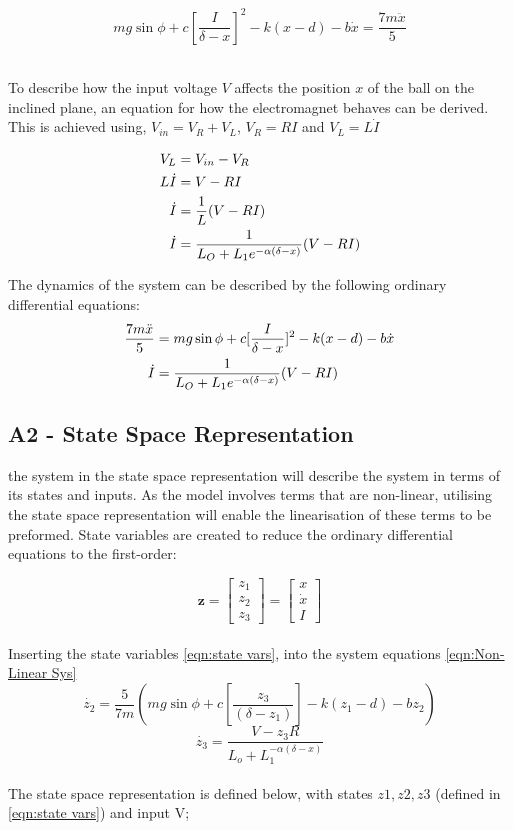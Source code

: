 \documentclass[a4paper,10pt,reqno]{amsart}
\numberwithin{equation}{section}
\begin{document}
\begin{equation}
    mg\sin{\phi}+c[\frac{I}{\delta-x}]^2-k(x-d)-b\dot{x}=\frac{7m\ddot{x}}{5}
\end{equation}
\\
\par To describe how the input voltage $V$ affects the position $x$ of the ball on the inclined plane, an equation for how the electromagnet behaves can be derived. This is achieved using, $V_{in}=V_R+V_L$, $V_R=RI$ and $V_L=L\dot{I}$

\begin{align}
    V_L&{}={}V_{in}-V_R
    \notag\\
    L\dot{I}&{}={}V-RI
    \notag\\
    \dot{I}&{}={}\frac{1}{L}(V-RI)
    \notag\\
    \dot{I}&{}={}\frac{1}{L_O+L_1e^{-\alpha(\delta-x)}}(V-RI)
\end{align}

The dynamics of the system can be described by the following ordinary differential equations:
\begin{align}
    \frac{7m\ddot{x}}{5}&{}={}mg\sin{\phi}+c[\frac{I}{\delta-x}]^2-k(x-d)-b\dot{x}
    \notag
    \\
    \dot{I}&{}={}\frac{1}{L_O+L_1e^{-\alpha(\delta-x)}}(V-RI)
    \label{eqn:Non-Linear Sys}
\end{align}
\subsection{A2 - State Space Representation}\label{sec:A2}

\parModelling the system in the state space representation will describe the system in terms of its states and inputs. As the model involves terms that are non-linear, utilising the state space representation will enable the linearisation of these terms to be preformed. State variables are created to reduce the ordinary differential equations to the first-order:

\begin{equation}
\label{eqn:state vars}
\bm{z}=
\begin{bmatrix}
z_1
\\
z_2
\\
z_3
\end{bmatrix}
=
\begin{bmatrix}
x
\\
\dot{x}
\\
I
\end{bmatrix}
\end{equation}
\\
Inserting the state variables \ref{eqn:state vars}, into the system equations \ref{eqn:Non-Linear Sys} 
\begin{equation}
    \dot{z_2}=\frac{5}{7m}(mg\sin{\phi}+c[\frac{z_3}{(\delta-z_1)}]-k(z_1-d)-bz_2)
\end{equation}
\begin{equation}
    \dot{z_3}=\frac{V-z_3R}{L_o+L_1^{-\alpha(\delta-x)}}
\end{equation}
\\
The state space representation is defined below, with states $z1, z2, z3$ (defined in \ref{eqn:state vars}) and input V;
\end{document}
